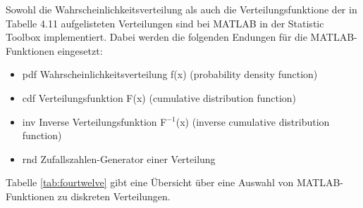 \noindent Sowohl die Wahrscheinlichkeitsverteilung als auch die Verteilungsfunktione der in Tabelle 4.11 aufgelisteten Verteilungen sind bei MATLAB in der Statistic Toolbox implementiert. Dabei werden die folgenden Endungen f\"{u}r die MATLAB-Funktionen eingesetzt:

\begin{itemize}
    \item pdf Wahrscheinlichkeitsverteilung f(x) (probability density function)
    \item  cdf Verteilungsfunktion F(x) (cumulative distribution function)
    \item  inv Inverse Verteilungsfunktion F$^{-1}$(x) (inverse cumulative distribution function)
    \item  rnd Zufallszahlen-Generator einer Verteilung
\end{itemize}

\noindent Tabelle \ref{tab:fourtwelve} gibt eine \"{U}bersicht \"{u}ber eine Auswahl von MATLAB-Funktionen zu diskreten Verteilungen.

\clearpage 

